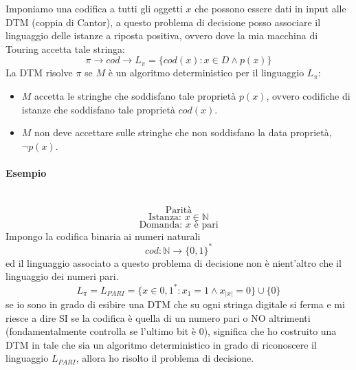 \documentclass{article}
\begin{document}
Imponiamo una codifica a tutti gli oggetti $x$ che possono essere dati in input alle DTM
(coppia di Cantor), a questo problema di decisione posso associare il linguaggio delle istanze
a riposta positiva, ovvero dove la mia macchina di Touring accetta tale stringa:
$$\pi\rightarrow cod\rightarrow L_\pi=\{cod(x):x\in D\land p(x)\}$$
La DTM risolve $\pi$ se $M$ è un algoritmo deterministico per il linguaggio $L_\pi$:
\begin{itemize}
    \item $M$ accetta le stringhe che soddisfano tale proprietà $p(x)$,
    ovvero codifiche di istanze che soddisfano tale proprietà $cod(x)$.
    \item $M$ non deve accettare sulle stringhe che non soddisfano la data proprietà,
     $\lnot p(x)$.
\end{itemize}
\paragraph{Esempio}\mbox{}\\
$$\text{Parità}$$
$$\text{Istanza: }x\in\mathbb{N}$$
$$\text{Domanda: }x\text{ è pari}$$
Impongo la codifica binaria ai numeri naturali
$$cod:\mathbb{N}\rightarrow\{0,1\}^*$$
ed il linguaggio associato a questo problema di decisione non è nient'altro che il linguaggio
dei numeri pari.
$$L_\pi=L_{PARI}=\{x\in{0,1}^*:x_1=1\land x_{|x|}=0\}\cup\{0\}$$
se io sono in grado di esibire una DTM che su ogni stringa digitale si ferma e mi riesce a
dire SI se la codifica è quella di un numero pari o NO altrimenti (fondamentalmente
controlla se l'ultimo bit è 0), significa che ho costruito una DTM
in tale che sia un algoritmo deterministico in grado
di riconoscere il linguaggio $L_{PARI}$, allora ho risolto il problema di decisione.
\end{document}
